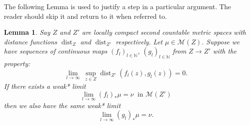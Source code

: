 \documentclass[reqno,11pt, twoside]{amsart}
\theoremstyle{plain}
\newtheorem{lem}[thm]{Lemma}
\theoremstyle{definition}
\theoremstyle{definition}
\theoremstyle{remark}
\numberwithin{equation}{section}
\newcommand{\dist}{\operatorname{dist}}
\newcommand{\N}{{\mathbb{N}}}
\begin{document}
The following Lemma is used to justify a step in a particular argument. The reader should skip it and return to it when referred to. 
\begin{lem}\label{lem: weak limit is the same under perturbations}
    Say $Z$ and $Z'$ are locally compact second countable metric spaces with distance functions $\dist_{Z}$ and $\dist_{Z'}$ respectively. Let $\mu \in \mathcal{M}(Z)$.
    Suppose we have sequences of continuous maps $(f_l)_{l \in \N}$,  $(g_l)_{l \in \N}$ from $Z \to Z'$ with the property:
    \begin{equation*}
        \lim_{l \to \infty}\ \sup_{z \in Z} \dist_{Z'}(f_l(z), g_l(z)) = 0.
    \end{equation*}
    If there exists a weak* limit
    \begin{equation*}
        \lim_{l \to \infty} (f_l)_* \mu = \nu\ \text{ in } \mathcal{M}(Z')
    \end{equation*}
    then we also have the same weak* limit
    \begin{equation*}
        \lim_{l \to \infty} (g_l)_* \mu = \nu.
    \end{equation*}
\end{lem}
\end{document}
